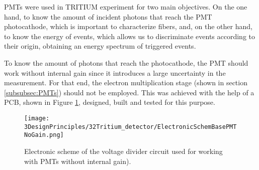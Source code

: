 PMTs were used in TRITIUM experiment for two main objectives. On the one hand, to know the amount of incident photons that reach the PMT photocathode, which is important to characterize fibers, and, on the other hand, to know the energy of events, which allows us to discriminate events according to their origin, obtaining an energy spectrum of triggered events. 

To know the amount of photons that reach the photocathode, the PMT should work without internal gain since it introduces a large uncertainty in the measurement. For that end, the electron multiplication stage (shown in section \ref{subsubsec:PMTs}) should not be employed. This was achieved with the help of a PCB, shown in Figure \ref{fig:ElectronicSchemeBasePMTNoGain}, designed, built and tested for this purpose.  

\begin{figure}[htbp]
\centering
\texttt{[image: 3DesignPrinciples/32Tritium\_detector/ElectronicSchemBasePMTNoGain.png]}
\caption{Electronic scheme of the voltage divider circuit used for working with PMTs without internal gain).\label{fig:ElectronicSchemeBasePMTNoGain}}
\end{figure}

